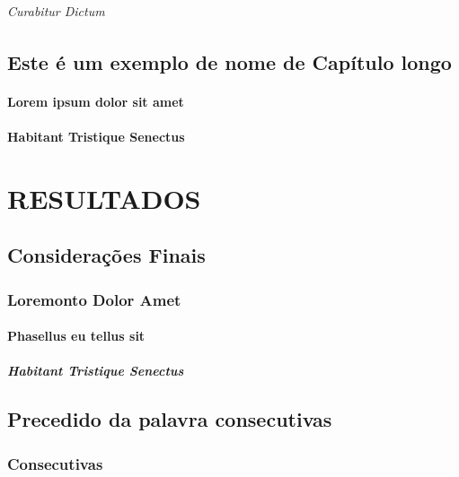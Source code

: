 \documentclass[a4paper,12pt,brazilian,oneside]{Relatorio}
\begin{document}
\paragraph{Curabitur Dictum}
\lipsum[1]

\chapter{Este é um exemplo de nome de Capítulo longo}
\lipsum[1]
\subsection{Lorem ipsum dolor sit amet}
\lipsum[1]
\subsection{Habitant Tristique Senectus}
\lipsum[1]


\part{RESULTADOS}

\chapter{Considerações Finais}
\lipsum[1]
\section{Loremonto Dolor Amet}
\lipsum[1]
\subsection{Phasellus eu tellus sit}
\lipsum[1]
\subsubsection{Habitant Tristique Senectus}
\lipsum[1]






\apendices
\chapter{Precedido da palavra consecutivas}
\section{Consecutivas}
\lipsum[8]
\end{document}

